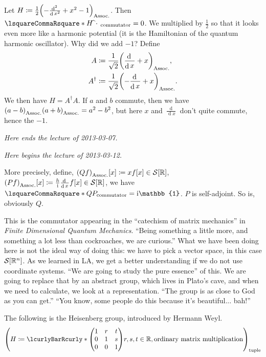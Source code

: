 \documentclass[10pt]{article}
\DeclarePairedDelimiter\parentheses{\lparen}{\rparen}
\DeclarePairedDelimiter\squareBrackets{[}{]}
\newcommand\I{\mathrm{i}}
\DeclareMathOperator{\diffd}{d}
\newcommand\ft\widehat
\newcommand{\adj}{^\dagger}
\newcommand\deriv[3][]{\frac{\diffd^{#1} {#3}}{{\diffd {#2}}^{#1}}}
\newcommand{\derivop}[2][]{\deriv[#1]{#2}{}}
\newcommand{\R}{\mathbb{R}}
\newcommand{\SchwartzSpace}{\mathcal{S}}
\newcommand\of[1]{\parentheses*{#1}}
\newcommand\pa[1]{\parentheses*{#1}}
\newcommand\tuple[1]{\parentheses*{#1}}
\newcommand\commutator[2]{\lsquareCommaRsquare*{#1}{#2}}
\newcommand{\setst}[2]{\lcurlyBarRcurly*{{\textstyle #1}}{{\textstyle #2}}}
\newcommand{\Identity}{\mathbb{1}}
\newcommand\placeholder{\,\:\cdot\:\,}
\renewcommand\pa[1]{\parentheses*{#1}_\mathrm{Assoc.}}
\renewcommand\of[1]{\squareBrackets*{#1}}
\renewcommand\tuple[1]{\parentheses*{#1}_{\mathrm{tuple}}}
\renewcommand\commutator[2]{\lsquareCommaRsquare*{#1}{#2}_{\mathrm{commutator}}}
\newcommand{\Rn}{{\R^n}}
\newcommand{\Schwartz}{{\SchwartzSpace\of{\Rn}}}
\newcommand{\lectureStart}[1]{

\noindent \emph{Here begins the lecture of #1.}

}
\newcommand{\lectureEnd}[1]{

\emph{Here ends the lecture of #1.}

}
\begin{document}
  Let $H \coloneqq \frac{1}{2}\pa{-\derivop[2]{x}+x^2-1}$. Then $\commutator H {\ft\placeholder}=0$. We multiplied by $\frac{1}{2}$ so that it looks even more like a harmonic potential (it is the Hamiltonian of the quantum harmonic oscillator). Why did we add $-1$? Define
  \begin{align*}
    A &\coloneqq \frac{1}{\sqrt 2}\pa{\derivop{x} + x},\\
    A\adj &\coloneqq \frac{1}{\sqrt 2}\pa{-\derivop{x} + x}.
  \end{align*}
  We then have $H = A\adj A$. If $a$ and $b$ commute, then we have $\pa{a-b}\pa{a+b}  = a^2-b^2$, but here $x$ and $\derivop{x}$ don't quite commute, hence the $-1$.
\lectureEnd{2013-03-07}
\lectureStart{2013-03-12}
More precisely, define, $\pa{Q f}\of x \coloneqq x f\of x \in \SchwartzSpace\of{\R}$, $\pa{P f}\of x \coloneqq \frac{h}{\I}\derivop x f\of x \in \SchwartzSpace\of{\R}$, we have $\commutator Q P = \I \Identity$. $P$ is self-adjoint.
So is, obviously $Q$.

This is the commutator appearing in the  ``catechism of matrix mechanics'' in \emph{Finite Dimensional Quantum Mechanics}.
``Being something a little more, and something a lot less than cockroaches, we are curious.'' What we have been doing here is not the ideal way of doing this: we have to pick a vector space, in this case $\Schwartz$. As we learned in LA, we get a better understanding if we do not use coordinate systems. 
``We are going to study the pure essence'' of this. We are going to replace that by an abstract group, which lives in Plato's cave, and when we need to calculate, we look at a representation. ``The group is as close to God as you can get.'' ``You know, some people do this because it's beautiful... bah!''

The following is the Heisenberg group, introduced by Hermann Weyl.
\begin{equation*}
\tuple{
H \coloneqq \setst{
\begin{pmatrix}
1 & r & t\\
0 & 1 & s\\
0 & 0 & 1\\
\end{pmatrix}
}{r,s,t\in\R}, 
\text{ordinary matrix multiplication}}
\end{equation*}
\end{document}
